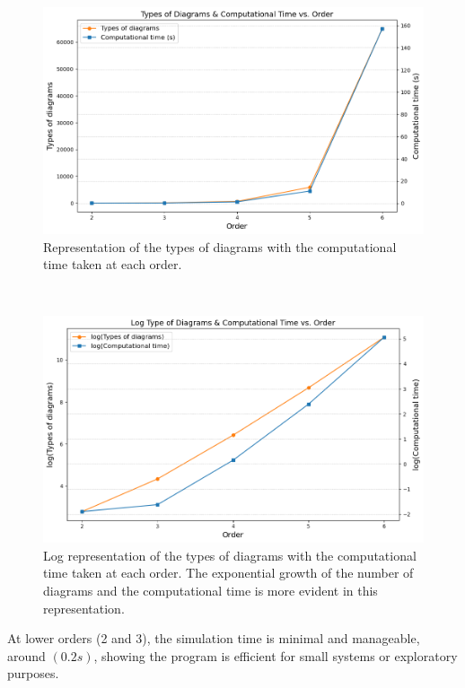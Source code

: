 \documentclass[11pt,a4paper,twoside,pdf]{article}
\numberwithin{equation}{section}
\begin{document}
\begin{figure}[h!]
    \centering
    \centering
    \includegraphics[width=\textwidth]{plots/performance.png}
    \caption{Representation of the types of diagrams with the computational time taken at
    each order.}
    \label{fig:performance}
\end{figure}
~
\begin{figure}[h!]
    \centering
    \centering
    \includegraphics[width=\textwidth]{plots/performace_log.png}
    \caption{Log representation of the types of diagrams with the computational time taken at
    each order. The exponential growth of the number of diagrams and the computational time
    is more evident in this representation.}
    \label{fig:performance_log}
\end{figure}

\newpage

At lower orders (2 and 3), the simulation time is minimal and manageable, around $( 0.2 s)$, 
showing the program is efficient for small systems or exploratory purposes.
\end{document}
